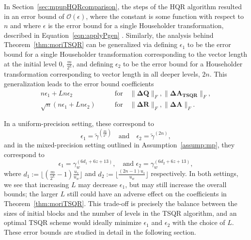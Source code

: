\documentclass[review,onefignum,onetabnum]{siamart190516}
\newcommand{\bb}[1]{\mathbf{#1}}
\begin{document}
In Section~\ref{sec:mpupHQRcomparison}, the steps of the HQR algorithm resulted in an error bound of  $\mathcal{O}(\epsilon)$, where the constant is some function with respect to $n$ and where $\epsilon$ is the error bound for a single Householder transformation, described in Equation~\ref{eqn:applyPgen} .
Similarly, the analysis behind Theorem~\ref{thm:moriTSQR} can be generalized via defining $\epsilon_1$ to be the error bound for a single Householder transformation corresponding to the vector length at the initial level $0$, $\frac{m}{2^L}$, and defining $\epsilon_2$ to be the error bound for a Householder transformation corresponding to vector length in all deeper levels,  $2n$.
This generalization leads to the error bound coefficients
\begin{align}
 n\epsilon_1 + Ln\epsilon_2& \qquad\text{for}\quad  \|\bb{\Delta Q}\|_F, \|\bb{\Delta \bb{A}_{\text{TSQR}}}\|_F,\\
 \sqrt{n}(n\epsilon_1+Ln\epsilon_2)& \qquad\text{for}\quad \|\bb{\Delta R}\|_F, \|\bb{\Delta A}\|_F.
\end{align}

In a uniform-precision setting, these correspond to
\begin{equation}
\epsilon_1 = \tilde{\gamma}^{(\frac{m}{2^L})}\quad \text{and}\quad \epsilon_2 = \tilde{\gamma}^{(2n)},
\end{equation}
and in the mixed-precision setting outlined in Assumption~\ref{assump:mp}, they correspond to
\begin{equation}
\epsilon_1 = \gamma_w^{(6d_1+6z+13)}, \quad \text{and } \epsilon_2 = \gamma_w^{(6d_2+6z+13)},
\end{equation}
where $d_1 := \lfloor{(\frac{m}{2^L}-1)\frac{u_s}{u_w}\rfloor}$ and $d_2 :=\lfloor \frac{(2n-1)u_s}{u_w}\rfloor$ respectively.
In both settings, we see that increasing $L$ may decrease $\epsilon_1$, but may still increase the overall bounds; the larger $L$ still could have an adverse effect on the coefficients in Theorem~\ref{thm:moriTSQR}.
This trade-off is precisely the balance between the sizes of initial blocks and the number of levels in the TSQR algorithm, and an optimal TSQR scheme would ideally minimize $\epsilon_1$ and $\epsilon_2$ with the choice of $L$.
These error bounds are studied in detail in the following section. %
\end{document}
